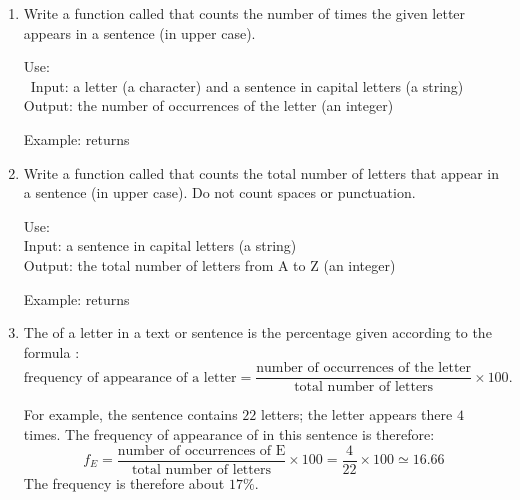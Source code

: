 \documentclass[11pt,class=report,crop=false]{standalone}
\begin{document}
\begin{activite}


\begin{enumerate}
  \item Write a function called  that counts the number of times the given letter appears in a sentence (in upper case).
  
    \begin{fonction}
   Use: \\\
   Input: a letter (a character) and a sentence in capital letters (a string)\\
   Output: the number of occurrences of the letter (an integer)
  
  \medskip
     
   Example:  returns 
  \end{fonction}
  
 \item Write a function called  that counts the total number of letters that appear in a sentence (in upper case). Do not count spaces or punctuation.
 
     \begin{fonction}
   Use: \\
   Input: a sentence in capital letters (a string)\\
   Output: the total number of letters from \og{}A\fg{} to \og{}Z\fg{} (an integer)
  
  \medskip
     
   Example:  returns 
  \end{fonction}
 
 \item The  of a letter in a text or sentence is the percentage given according to the formula :
 $$\text{frequency of appearance of a letter} = \frac{\text{number of occurrences of the letter}}{\text{total number of letters}} \times 100.$$
 
 \medskip
 
 For example, the sentence  contains $22$ letters; 
  the letter  appears there $4$ times. The frequency of appearance of \mot{E} in this sentence is therefore:
  $$f_E = \frac{\text{number of occurrences of E}}{\text{total number of letters}} \times 100  = \frac{4}{22} \times  100 \simeq 16.66$$
 The frequency is therefore about $17\%$.
  

\end{enumerate}
\end{activite}
\end{document}
